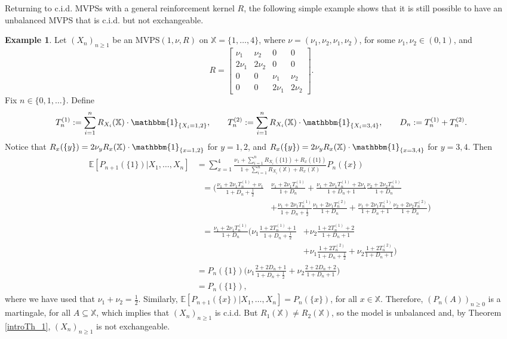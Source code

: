 \documentclass[a4paper]{article}
\theoremstyle{plain}
\theoremstyle{remark}
\theoremstyle{definition}
\newtheorem{example}[theorem]{Example}
\begin{document}
Returning to c.i.d. MVPSs with a general reinforcement kernel $R$, the following simple example shows that it is still possible to have an unbalanced MVPS that is c.i.d. but not exchangeable.

\begin{example}\label{example:other:cid}
Let $(X_n)_{n\geq1}$ be an MVPS$(1,\nu,R)$ on $\mathbb{X}=\{1,\ldots,4\}$, where $\nu=(\nu_1,\nu_2,\nu_1,\nu_2)$, for some $\nu_1,\nu_2\in(0,1)$, and
\[R=\left[\begin{array}{cccc} \nu_1 & \nu_2 & 0 & 0 \\ 2\nu_1 & 2\nu_2 & 0 & 0 \\ 0 & 0 & \nu_1 & \nu_2 \\ 0 & 0 & 2\nu_1 & 2\nu_2 \end{array}\right].\]
Fix $n\in\{0,1,\ldots\}$. Define
\[T_n^{(1)}:=\sum_{i=1}^nR_{X_i}(\mathbb{X})\cdot\mathbbm{1}_{\{X_i=1,2\}},\qquad T_n^{(2)}:=\sum_{i=1}^nR_{X_i}(\mathbb{X})\cdot\mathbbm{1}_{\{X_i=3,4\}},\qquad D_n:=T_n^{(1)}+T_n^{(2)}.\]
Notice that $R_x(\{y\})=2\nu_yR_x(\mathbb{X})\cdot\mathbbm{1}_{\{x=1,2\}}$ for $y=1,2$, and $R_x(\{y\})=2\nu_yR_x(\mathbb{X})\cdot\mathbbm{1}_{\{x=3,4\}}$ for $y=3,4$. Then
\begingroup\allowdisplaybreaks
\begin{align*}
\mathbb{E}[P_{n+1}(\{1\})|X_1,\ldots,X_n]&=\sum_{x=1}^4\frac{\nu_1+\sum_{i=1}^nR_{X_i}(\{1\})+R_x(\{1\})}{1+\sum_{i=1}^nR_{X_i}(\mathbb{X})+R_x(\mathbb{X})}P_n(\{x\})\\
&\begin{aligned}\;=\biggl(\frac{\nu_1+2\nu_1T_n^{(1)}+\nu_1}{1+D_n+\frac{1}{2}}&\frac{\nu_1+2\nu_1T_n^{(1)}}{1+D_n}+\frac{\nu_1+2\nu_1T_n^{(1)}+2\nu_1}{1+D_n+1}\frac{\nu_2+2\nu_2T_n^{(1)}}{1+D_n}\\
&+\frac{\nu_1+2\nu_1T_n^{(1)}}{1+D_n+\frac{1}{2}}\frac{\nu_1+2\nu_1T_n^{(2)}}{1+D_n}+\frac{\nu_1+2\nu_1T_n^{(1)}}{1+D_n+1}\frac{\nu_2+2\nu_2T_n^{(2)}}{1+D_n}\biggr)\end{aligned}\\
&\begin{aligned}\;=\frac{\nu_1+2\nu_1T_n^{(1)}}{1+D_n}\biggl(\nu_1\frac{1+2T_n^{(1)}+1}{1+D_n+\frac{1}{2}}&+\nu_2\frac{1+2T_n^{(1)}+2}{1+D_n+1}\\
&+\nu_1\frac{1+2T_n^{(2)}}{1+D_n+\frac{1}{2}}+\nu_2\frac{1+2T_n^{(2)}}{1+D_n+1}\biggr)\end{aligned}\\
&=P_n(\{1\})\biggl(\nu_1\frac{2+2D_n+1}{1+D_n+\frac{1}{2}}+\nu_2\frac{2+2D_n+2}{1+D_n+1}\biggr)\\
&=P_n(\{1\}),
\end{align*}
\endgroup
where we have used that $\nu_1+\nu_2=\frac{1}{2}$. Similarly, $\mathbb{E}[P_{n+1}(\{x\})|X_1,\ldots,X_n]=P_n(\{x\})$, for all $x\in\mathbb{X}$. Therefore, $(P_n(A))_{n\geq0}$ is a martingale, for all $A\subseteq\mathbb{X}$, which implies that $(X_n)_{n\geq1}$ is c.i.d. But $R_1(\mathbb{X})\neq R_2(\mathbb{X})$, so the model is unbalanced and, by Theorem \ref{introTh_1}, $(X_n)_{n\geq1}$ is not exchangeable.
\end{example}
\end{document}
